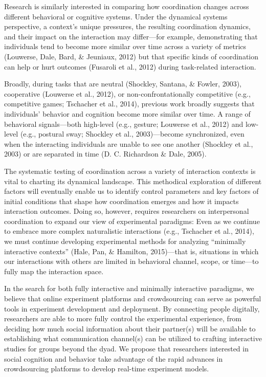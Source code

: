 \documentclass[10pt, letterpaper]{article}
\begin{document}
Research is similarly interested in comparing how coordination changes
across different behavioral or cognitive systems. Under the dynamical
systems perspective, a context's unique pressures, the resulting
coordination dynamics, and their impact on the interaction may
differ---for example, demonstrating that individuals tend to become more
similar over time across a variety of metrics (Louwerse, Dale, Bard, \&
Jeuniaux, 2012) but that specific kinds of coordination can help or hurt
outcomes (Fusaroli et al., 2012) during task-related interaction.

Broadly, during tasks that are neutral (Shockley, Santana, \& Fowler,
2003), cooperative (Louwerse et al., 2012), or non-confrontationally
competitive (e.g., competitive games; Tschacher et al., 2014), previous
work broadly suggests that individuals' behavior and cognition become
more similar over time. A range of behavioral signals---both high-level
(e.g., gesture; Louwerse et al., 2012) and low-level (e.g., postural
sway; Shockley et al., 2003)---become synchronized, even when the
interacting individuals are unable to see one another (Shockley et al.,
2003) or are separated in time (D. C. Richardson \& Dale, 2005).

The systematic testing of coordination across a variety of interaction
contexts is vital to charting its dynamical landscape. This methodical
exploration of different factors will eventually enable us to identify
control parameters and key factors of initial conditions that shape how
coordination emerges and how it impacts interaction outcomes. Doing so,
however, requires researchers on interpersonal coordination to expand
our view of experimental paradigms: Even as we continue to embrace more
complex naturalistic interactions (e.g., Tschacher et al., 2014), we
must continue developing experimental methods for analyzing ``minimally
interactive contexts'' (Hale, Pan, \& Hamilton, 2015)---that is,
situations in which our interactions with others are limited in
behavioral channel, scope, or time---to fully map the interaction space.

In the search for both fully interactive and minimally interactive
paradigms, we believe that online experiment platforms and crowdsourcing
can serve as powerful tools in experiment development and deployment. By
connecting people digitally, researchers are able to more fully control
the experimental experience, from deciding how much social information
about their partner(s) will be available to establishing what
communication channel(s) can be utilized to crafting interactive studies
for groups beyond the dyad. We propose that researchers interested in
social cognition and behavior take advantage of the rapid advances in
crowdsourcing platforms to develop real-time experiment models.
\end{document}
